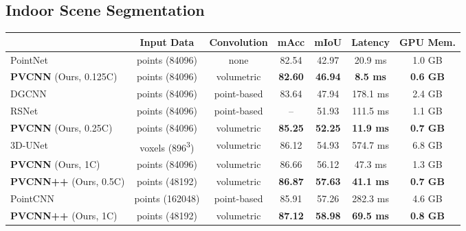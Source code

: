 \documentclass{article}
\def\modelshort{PVCNN\xspace}
\def\modelshortp{PVCNN++\xspace}
\begin{document}
\subsection{Indoor Scene Segmentation}

\begin{table*}[t]
\setlength{\tabcolsep}{5.5pt}
\small\centering
\begin{tabular}{lcccccc}
    \toprule
    & Input Data & Convolution & mAcc & mIoU & Latency & GPU Mem. \\
    \midrule
    PointNet~\cite{Qi:2017vq} & points (84096) & none & 82.54 & 42.97 & 20.9 ms & 1.0 GB\\
    \textbf{\modelshort} (Ours, 0.125C) & points (84096) & volumetric & \textbf{82.60} & \textbf{46.94} & \textbf{8.5 ms} & \textbf{0.6 GB}\\
    \midrule
    DGCNN~\cite{Wang:2018dg} & points (84096) & point-based & 83.64 & 47.94 & 178.1 ms & 2.4 GB \\
    RSNet~\cite{Huang:2018rs} & points (84096) & point-based & -- & 51.93 & 111.5 ms & 1.1 GB \\
    \textbf{\modelshort} (Ours, 0.25C) & points (84096) & volumetric & \textbf{85.25} & \textbf{52.25} & \textbf{11.9 ms} & \textbf{0.7 GB}\\
    \midrule
    3D-UNet~\cite{Cicek:2016un} & voxels (896\textsuperscript{3}) & volumetric & 86.12 & 54.93 & 574.7 ms & 6.8 GB \\
    \textbf{\modelshort} (Ours, 1C) & points (84096) & volumetric & 86.66 & 56.12 & 47.3 ms & 1.3 GB \\
    \textbf{\modelshortp} (Ours, 0.5C) & points (48192) & volumetric & \textbf{86.87} & \textbf{57.63} & \textbf{41.1 ms} & \textbf{0.7 GB}\\
    \midrule
    PointCNN~\cite{Li:2018tp} & points (162048) & point-based & 85.91 & 57.26 & 282.3 ms & 4.6 GB \\
    \textbf{\modelshortp} (Ours, 1C) & points (48192) & volumetric & \textbf{87.12} & \textbf{58.98} & \textbf{69.5 ms} & \textbf{0.8 GB} \\
    \bottomrule
\end{tabular}
\caption{Results of indoor scene segmentation on S3DIS. On average, our \modelshort and \modelshortp outperform the point-based models with \textbf{8} measured speedup and \textbf{3} memory reduction, and outperform the voxel-based baseline with \textbf{14} measured speedup and \textbf{10} memory reduction.}
\label{tab:s3dis_results}
\vspace{-6pt}

\end{table*}
\end{document}
